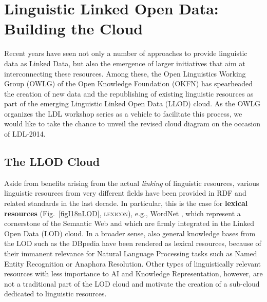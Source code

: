 \section{Linguistic Linked Open Data: Building the Cloud}

Recent years have seen not only a number of approaches to provide linguistic data as Linked Data, but also the emergence of larger initiatives that aim at interconnecting these resources.
Among these, the Open Linguistics Working Group (OWLG) of the Open Knowledge Foundation (OKFN) has spearheaded the creation of 
new data and the republishing of existing linguistic resources as part of the emerging Linguistic Linked Open Data (LLOD) cloud. 
As the OWLG organizes the LDL workshop series as a vehicle to facilitate this process, we would like to take the chance to unveil the revised cloud diagram on the occasion of LDL-2014.

\subsection{The LLOD Cloud}

Aside from benefits arising from the actual \emph{linking} of linguistic resources, various linguistic resources from very different fields have been provided in RDF and related standards in the last decade. In particular, this is the case for \textbf{lexical resources} (Fig.\ \ref{figI18nLOD}, \textsc{lexicon}), e.g., WordNet \citep{gangemi2003ontowordnet}, which represent a cornerstone of the Semantic Web and which are firmly integrated in the Linked Open Data (LOD) cloud. In a broader sense, also general knowledge bases from the LOD such as the DBpedia have been rendered as lexical resources, because of their immanent relevance for Natural Language Processing tasks such as Named Entity Recognition or Anaphora Resolution. Other types of linguistically relevant resources with less importance to AI and Knowledge Representation, however, are not a traditional part of the LOD cloud and motivate the creation of a sub-cloud dedicated to linguistic resources.

